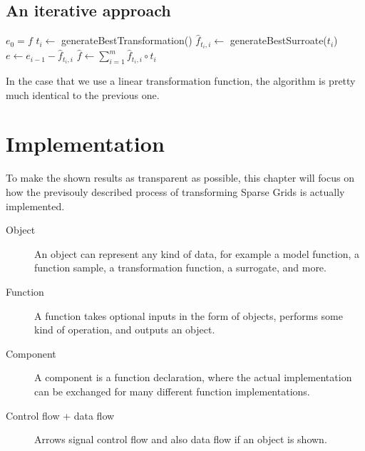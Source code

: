 \documentclass[
  a4paper,  %
  twoside,  %
  bibliography=totoc,
  headsepline,
  cleardoublepage=empty,
  parskip=half,
  draft=false
]{scrbook}
\begin{document}

\section{An iterative approach}

\begin{algorithm}[H]
\normalsize
\begin{algorithmic}
    \State $e_0 = f$
    	\State $t_i \gets$ generateBestTransformation()
    	\State $\hat{f}_{t_i,i} \gets$ generateBestSurroate($t_i$)
    	\State $e \gets e_{i - 1} - \hat{f}_{t_i,i}$
    \EndFor
    \State $\hat{f} \gets \sum_{i=1}^m \hat{f}_{t_i, i} \circ t_i$
    \State {}
\EndFunction
\end{algorithmic}
\end{algorithm}

In the case that we use a linear transformation function, the algorithm is pretty much identical to the previous one.

\chapter{Implementation}

To make the shown results as transparent as possible, this chapter will focus on how the previsouly described process of transforming Sparse Grids is actually implemented.

\begin{description}
\item[Object] An object can represent any kind of data, for example a model function, a function sample, a transformation function, a surrogate, and more.
\item[Function] A function takes optional inputs in the form of objects, performs some kind of operation, and outputs an object.
\item[Component] A component is a function declaration, where the actual implementation can be exchanged for many different function implementations.
\item[Control flow + data flow] Arrows signal control flow and also data flow if an object is shown.
\end{description}
\end{document}

